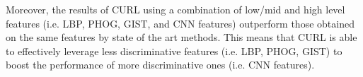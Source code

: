 \documentclass[journal,11pt]{IEEEtran}
\begin{document}
Moreover, the results of CURL using a combination of low/mid and high level features (i.e. LBP, PHOG, GIST, and CNN features) outperform those obtained on the same features by state of the art methods. This means that CURL is able to effectively leverage less discriminative features (i.e. LBP, PHOG, GIST) to boost the performance of more discriminative ones (i.e. CNN features). %




\ifCLASSOPTIONcaptionsoff
  \newpage
\fi







%
%
%






\end{document}
